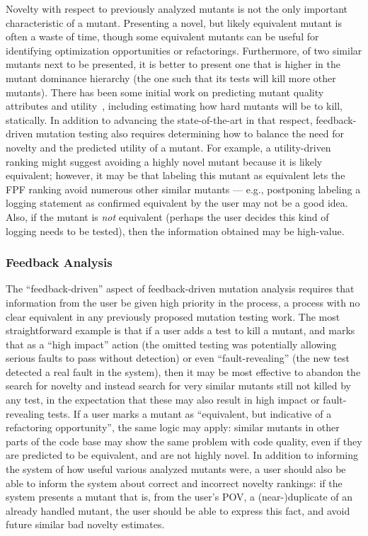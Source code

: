 Novelty with respect to previously analyzed mutants is not the only
important characteristic of a mutant.  Presenting a novel, but likely
equivalent mutant is often a waste of time, though some equivalent
mutants can be useful for identifying optimization opportunities or
refactorings.  Furthermore, of two similar mutants next to be presented,
it is better to present one that is higher in the mutant dominance
hierarchy (the one such that its tests will kill more other mutants).
There has been some initial work on predicting mutant quality
attributes and utility~\cite{MutQuality,FaRM}, including estimating how hard mutants
will be to kill, statically.  In addition to advancing the
state-of-the-art in that respect, feedback-driven mutation testing
also requires determining how to balance the need for novelty and the
predicted utility of a mutant.  For example, a utility-driven ranking
might suggest avoiding a highly novel mutant because it is likely
equivalent; however, it may be that labeling this mutant as equivalent
lets the FPF ranking avoid numerous other similar mutants --- e.g.,
postponing labeling a logging statement as confirmed equivalent by the
user may not be a
good idea.  Also, if the mutant is \emph{not} equivalent (perhaps the
user decides this kind of logging needs to be tested), then the
information obtained may be high-value.

\subsubsection{Feedback Analysis}
\label{sec:feedbackplan}

The ``feedback-driven'' aspect of feedback-driven mutation analysis
requires that information from the user be given high priority in the
process, a process with no clear equivalent in any previously proposed
mutation testing work.  The most straightforward example is that if a
user adds a test to kill a mutant, and marks that as a ``high impact''
action (the omitted testing was potentially allowing serious faults to
pass without detection) or even ``fault-revealing'' (the new test
detected a real fault in the system), then it may be most effective to
abandon the search for novelty and instead search for very similar
mutants still not killed by any test, in the expectation that these
may also result in high impact or fault-revealing tests.  If a user
marks a mutant as ``equivalent, but indicative of a refactoring
opportunity'', the same logic may apply:  similar mutants in other
parts of the code base may show the same problem with code quality,
even if they are predicted to be equivalent, and are not highly
novel.  In addition to informing the system of how useful various
analyzed mutants were, a user should also be able to inform the system
about correct and incorrect novelty rankings:  if the system presents
a mutant that is, from the user's POV, a (near-)duplicate of an
already handled mutant, the user should be able to express this fact,
and avoid future similar bad novelty estimates.

